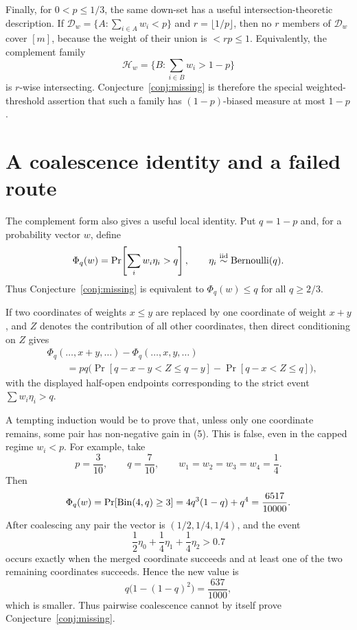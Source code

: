 \documentclass[12pt]{article}
\newcommand{\Ber}{\operatorname{Bernoulli}}
\begin{document}
Finally, for \(0<p\le1/3\), the same down-set has a useful
intersection-theoretic description.  If
\(\mathcal D_w=\{A:\sum_{i\in A}w_i<p\}\) and
\(r=\lfloor1/p\rfloor\), then no \(r\) members of \(\mathcal D_w\) cover
\([m]\), because the weight of their union is \(<rp\le1\).  Equivalently, the
complement family
\[
   \mathcal H_w=\{B:\sum_{i\in B}w_i>1-p\}
\]
is \(r\)-wise intersecting.  Conjecture~\ref{conj:missing} is therefore the special
weighted-threshold assertion that such a family has \((1-p)\)-biased measure at
most \(1-p\).

\section*{A coalescence identity and a failed route}

The complement form also gives a useful local identity.  Put \(q=1-p\) and,
for a probability vector \(w\), define
\[
      \Phi_q(w)=\Pr\!\left[\sum_i w_i\eta_i>q\right],
      \qquad \eta_i\stackrel{\rm iid}{\sim}\Ber(q).
\]
Thus Conjecture~\ref{conj:missing} is equivalent to \(\Phi_q(w)\le q\) for all
\(q\ge2/3\).

If two coordinates of weights \(x\le y\) are replaced by one coordinate of
weight \(x+y\), and \(Z\) denotes the contribution of all other coordinates,
then direct conditioning on \(Z\) gives
\begin{equation}
\begin{aligned}
&\Phi_q(\ldots,x+y,\ldots)-\Phi_q(\ldots,x,y,\ldots)        \\
&\qquad
 =pq\Big(
       \Pr[q-x-y<Z\le q-y]
       -\Pr[q-x<Z\le q]
     \Big),
\end{aligned}                                      \tag{5}
\end{equation}
with the displayed half-open endpoints corresponding to the strict event
\(\sum w_i\eta_i>q\).

A tempting induction would be to prove that, unless only one coordinate remains,
some pair has non-negative gain in (5).  This is false, even in the capped regime
\(w_i<p\).  For example, take
\[
        p=\frac3{10},\qquad q=\frac7{10},\qquad
        w_1=w_2=w_3=w_4=\frac14 .
\]
Then
\[
   \Phi_q(w)=\Pr[{\rm Bin}(4,q)\ge3]
            =4q^3(1-q)+q^4=\frac{6517}{10000}.
\]
After coalescing any pair the vector is \((1/2,1/4,1/4)\), and the event
\[
        \frac12\eta_0+\frac14\eta_1+\frac14\eta_2>0.7
\]
occurs exactly when the merged coordinate succeeds and at least one of the two
remaining coordinates succeeds.  Hence the new value is
\[
        q\bigl(1-(1-q)^2\bigr)=\frac{637}{1000},
\]
which is smaller.  Thus pairwise coalescence cannot by itself prove
Conjecture~\ref{conj:missing}.
\end{document}
